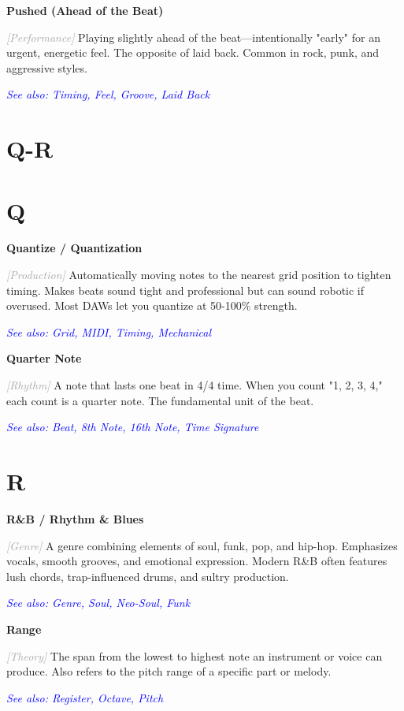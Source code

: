 \documentclass[11pt,letterpaper]{article}
\newcommand{\term}[1]{\textbf{\large\color{purple}#1}}
\newcommand{\category}[1]{\textcolor{darkgray}{\textit{\small [#1]}}}
\newcommand{\seealso}[1]{\textcolor{blue}{\textit{See also: #1}}}
\newenvironment{termdef}[1]
  {\noindent\term{#1}\par\nopagebreak}
  {\par\vspace{0.3em}}
\begin{document}
\begin{termdef}{Pushed (Ahead of the Beat)}
\category{Performance}
Playing slightly ahead of the beat—intentionally "early" for an urgent, energetic feel. The opposite of laid back. Common in rock, punk, and aggressive styles.

\seealso{Timing, Feel, Groove, Laid Back}
\end{termdef}

\newpage

\section*{Q-R}

\section*{Q}

\begin{termdef}{Quantize / Quantization}
\category{Production}
Automatically moving notes to the nearest grid position to tighten timing. Makes beats sound tight and professional but can sound robotic if overused. Most DAWs let you quantize at 50-100\% strength.

\seealso{Grid, MIDI, Timing, Mechanical}
\end{termdef}

\begin{termdef}{Quarter Note}
\category{Rhythm}
A note that lasts one beat in 4/4 time. When you count "1, 2, 3, 4," each count is a quarter note. The fundamental unit of the beat.

\seealso{Beat, 8th Note, 16th Note, Time Signature}
\end{termdef}

\section*{R}

\begin{termdef}{R\&B / Rhythm \& Blues}
\category{Genre}
A genre combining elements of soul, funk, pop, and hip-hop. Emphasizes vocals, smooth grooves, and emotional expression. Modern R\&B often features lush chords, trap-influenced drums, and sultry production.

\seealso{Genre, Soul, Neo-Soul, Funk}
\end{termdef}

\begin{termdef}{Range}
\category{Theory}
The span from the lowest to highest note an instrument or voice can produce. Also refers to the pitch range of a specific part or melody.

\seealso{Register, Octave, Pitch}
\end{termdef}
\end{document}
